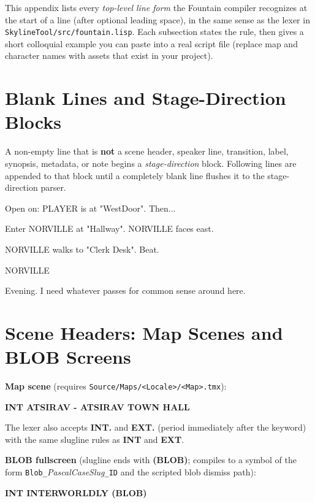 \documentclass[11pt,letterpaper,oldstylefigures]{memoir}
\newcommand{\slugline}[1]{\nobreak\textbf{\MakeUppercase{#1}}\par\nobreak\vspace{1\baselineskip}}
\newcommand{\speaker}[1]{\nobreak\hspace*{0.333\textwidth}\MakeUppercase{#1}\par\nobreak\vspace{0.5\baselineskip}}
\newcommand{\dialogue}[1]{\nobreak\hspace*{0.25\textwidth}\begin{minipage}{0.5\textwidth}#1\end{minipage}\par\vspace{1\baselineskip}}
\newcommand{\stagedir}[1]{#1\par\vspace{1\baselineskip}}
\newenvironment{FountainExample}
  {\begingroup
  \ttfamily\small
   \setlength{\parindent}{0pt}
  \setlength{\parskip}{0.5em}
  \allowdisplaybreaks
  \setlength{\displaywidowpenalty}{0}
  \setlength{\widowpenalty}{0}
  \setlength{\clubpenalty}{0}
  \setlength{\interlinepenalty}{0}
}
  {\endgroup}
\newcommand{\fountain}[1]{\textbf{#1}}
\begin{document}
This appendix lists every \emph{top-level line form} the Fountain compiler recognizes at the start of a line (after optional leading space), in the same sense as the lexer in \texttt{SkylineTool/src/fountain.lisp}. Each subsection states the rule, then gives a short colloquial example you can paste into a real script file (replace map and character names with assets that exist in your project).

\section{Blank Lines and Stage-Direction Blocks}

A non-empty line that is \textbf{not} a scene header, speaker line, transition, label, synopsis, metadata, or note begins a \emph{stage-direction} block. Following lines are appended to that block until a completely blank line flushes it to the stage-direction parser.

\begin{FountainExample}
\stagedir{Open on: PLAYER is at "WestDoor". Then...}
\stagedir{Enter NORVILLE at "Hallway". NORVILLE faces east.}
\stagedir{NORVILLE walks to "Clerk Desk". Beat.}

\speaker{NORVILLE}
\dialogue{Evening. I need whatever passes for common sense around here.}
\end{FountainExample}

\section{Scene Headers: Map Scenes and BLOB Screens}

\textbf{Map scene} (requires \texttt{Source/Maps/<Locale>/<Map>.tmx}):

\begin{FountainExample}
\slugline{INT ATSIRAV - ATSIRAV TOWN HALL}
\end{FountainExample}

\noindent The lexer also accepts \fountain{INT.} and \fountain{EXT.} (period immediately after the keyword) with the same slugline rules as \fountain{INT} and \fountain{EXT}.

\textbf{BLOB fullscreen} (slugline ends with \fountain{(BLOB)}; compiles to a symbol of the form \texttt{Blob\_}\textit{PascalCaseSlug}\texttt{\_ID} and the scripted blob dismiss path):

\begin{FountainExample}
\slugline{INT INTERWORLDLY (BLOB)}
\end{FountainExample}
\end{document}
